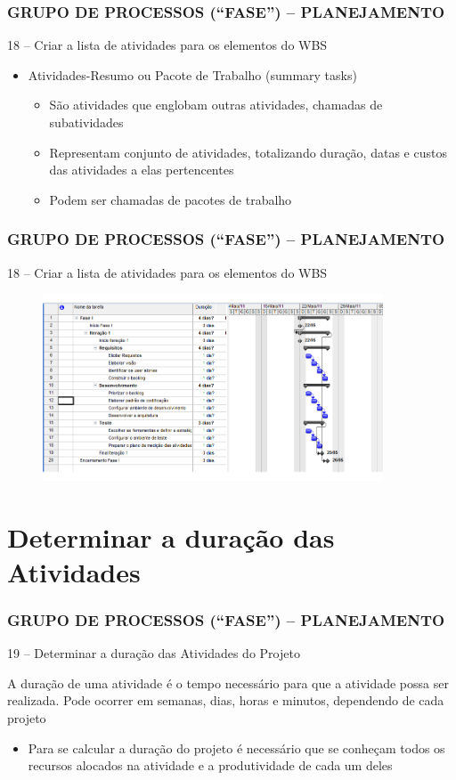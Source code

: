\begin{frame}
 \frametitle{GRUPO DE PROCESSOS (“FASE”) – PLANEJAMENTO}
18 – Criar a lista de atividades para os elementos do WBS
  \begin{itemize}
   \item Atividades-Resumo ou Pacote de Trabalho (summary tasks)
   \begin{itemize}
    \item São atividades que englobam outras atividades, chamadas de subatividades
    \item Representam conjunto de atividades, totalizando duração, datas e custos das atividades a elas pertencentes
    \item  Podem ser chamadas de pacotes de trabalho
   \end{itemize}
  \end{itemize}
\end{frame}

\begin{frame}
 \frametitle{GRUPO DE PROCESSOS (“FASE”) – PLANEJAMENTO}
18 – Criar a lista de atividades para os elementos do WBS
  \begin{figure}
   \centering
   \includegraphics[width = 0.9\textwidth]{figs/fig2.png}
  \end{figure}
\end{frame}


\section{Determinar a duração das Atividades}
\begin{frame}
 \frametitle{GRUPO DE PROCESSOS (“FASE”) – PLANEJAMENTO}
19 – Determinar a duração das Atividades do Projeto
  \begin{block}{}
 A duração de uma atividade é o tempo necessário para que a atividade possa ser realizada. Pode ocorrer em semanas, dias, horas e minutos, dependendo de cada projeto
  \end{block}
  \begin{itemize}
   \item Para se calcular a duração do projeto é necessário que se conheçam todos os recursos alocados na atividade e a produtividade de cada um deles
  \end{itemize}
\end{frame}

